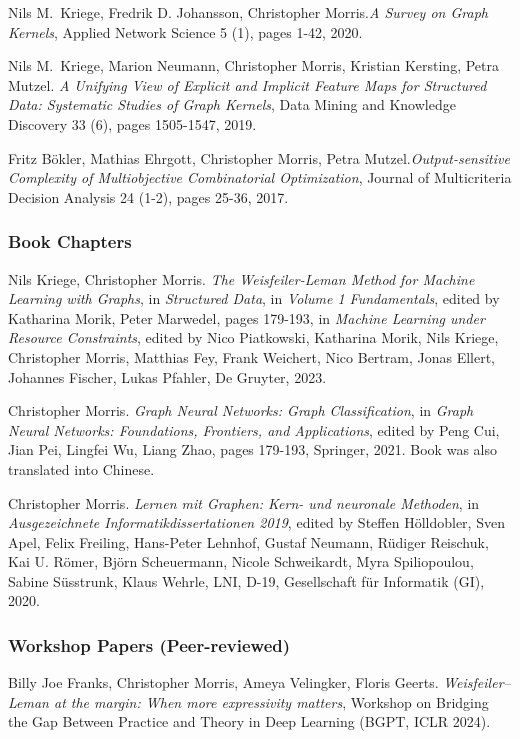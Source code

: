 \documentclass[11pt, a4paper, DIV=14, headings=small]{scrartcl}
\begin{document}
\begin{thebibliography}{15}
		Nils M.~Kriege,  Fredrik D. Johansson, Christopher Morris.\footnotemark[2]
		\emph{A Survey on Graph Kernels},
		Applied Network Science 5 (1), pages 1-42, 2020.
		
		Nils M.~Kriege,  Marion Neumann, Christopher Morris, Kristian Kersting, Petra Mutzel.
		\emph{A Unifying View of Explicit and Implicit Feature Maps for Structured Data: Systematic Studies of Graph Kernels},
		Data Mining and Knowledge Discovery 33 (6), pages 1505-1547, 2019.
		
		Fritz B\"okler, Mathias Ehrgott, Christopher Morris, Petra Mutzel.\footnotemark[1]
		\emph{Output-sensitive Complexity of Multiobjective Combinatorial Optimization},
		Journal of Multicriteria Decision Analysis 24 (1-2), pages 25-36, 2017.
		
		\subsubsection*{Book Chapters}
		
		Nils Kriege, Christopher Morris.
		\emph{The Weisfeiler-Leman Method for Machine Learning with Graphs},
		in \emph{Structured Data}, in \emph{Volume 1 Fundamentals}, edited by Katharina Morik, Peter Marwedel, pages 179-193, in \emph{Machine Learning under Resource Constraints},
		edited by Nico Piatkowski, Katharina Morik, Nils Kriege, Christopher Morris, Matthias Fey, Frank Weichert, Nico Bertram, Jonas Ellert, Johannes Fischer, Lukas Pfahler, De Gruyter, 2023.
		
		Christopher Morris.
		\emph{Graph Neural Networks: Graph Classification},
		in \emph{Graph Neural Networks: Foundations, Frontiers, and Applications}, edited by Peng Cui, Jian Pei, Lingfei Wu, Liang Zhao, pages 179-193, Springer, 2021. Book was also translated into Chinese.
		
		Christopher Morris.
		\emph{Lernen mit Graphen: Kern- und neuronale Methoden}, in
		\emph{Ausgezeichnete Informatikdissertationen 2019}, edited by Steffen H{\"o}lldobler, Sven Apel, Felix Freiling, Hans-Peter Lehnhof, Gustaf Neumann, R{\"u}diger Reischuk, Kai U. R{\"o}mer, Bj{\"o}rn Scheuermann, Nicole Schweikardt, Myra Spiliopoulou, Sabine S{\"u}sstrunk, Klaus Wehrle, LNI, D-19, Gesellschaft f{\"u}r Informatik (GI), 2020.
		
		\subsubsection*{Workshop Papers (Peer-reviewed)}
		Billy Joe Franks, Christopher Morris, Ameya 	Velingker, Floris Geerts.
		\emph{Weisfeiler–Leman at the margin: When more expressivity matters},
		Workshop on Bridging the Gap Between Practice and   Theory in Deep Learning (BGPT, ICLR 2024).
		

\end{thebibliography}
\end{document}
